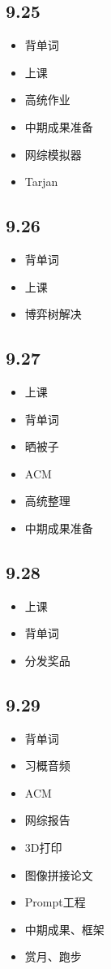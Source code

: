 \documentclass[UTF8]{ctexart}
\begin{document}
\subsection*{9.25}
\begin{itemize}
    \item 背单词
    \item 上课
    \item 高统作业
    \item 中期成果准备
    \item 网综模拟器
    \item Tarjan
\end{itemize}
\subsection*{9.26}
\begin{itemize}
    \item 背单词
    \item 上课
    \item 博弈树解决
\end{itemize}
\subsection*{9.27}
\begin{itemize}
    \item 上课
    \item 背单词
    \item 晒被子
    \item ACM
    \item 高统整理
    \item 中期成果准备
\end{itemize}
\subsection*{9.28}
\begin{itemize}
    \item 上课
    \item 背单词
    \item 分发奖品
\end{itemize}
\subsection*{9.29}
\begin{itemize}
    \item 背单词
    \item 习概音频
    \item ACM
    \item 网综报告
    \item 3D打印
    \item 图像拼接论文
    \item Prompt工程
    \item 中期成果、框架
    \item 赏月、跑步
\end{itemize}
\end{document}
